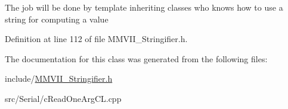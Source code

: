 The job will be done by template inheriting classes who knows how to use a string for computing a value 

Definition at line 112 of file M\+M\+V\+I\+I\+\_\+\+Stringifier.\+h.



The documentation for this class was generated from the following files\+:\begin{DoxyCompactItemize}
\item 
include/\hyperlink{MMVII__Stringifier_8h}{M\+M\+V\+I\+I\+\_\+\+Stringifier.\+h}\item 
src/\+Serial/c\+Read\+One\+Arg\+C\+L.\+cpp\end{DoxyCompactItemize}
